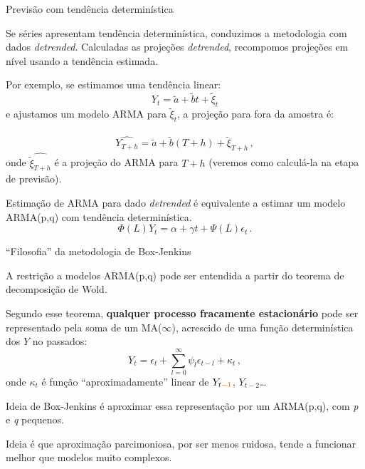 \documentclass[11pt]{beamer}
\newenvironment{halfwideitemize}{\itemize\addtolength{\itemsep}{0.5em}}{\enditemize}
\begin{document}
\begin{frame}{Previsão com tendência determinística}
	\begin{halfwideitemize}
				\item Se séries apresentam tendência determinística, conduzimos a metodologia com dados \textit{detrended}. Calculadas as projeções \textit{detrended}, recompomos projeções em nível usando a tendência estimada.
				
				\item Por exemplo, se estimamos uma tendência linear:
				$$Y_t = \tilde{a} + \tilde{b}t + \tilde{\xi}_t$$
				e ajustamos um modelo ARMA  para $\tilde{\xi}_t$, a projeção para fora da amostra é:
				
				$$\widehat{Y_{T+h}} = \tilde{a} + \tilde{b}(T+h) + \widehat{\tilde{\xi}_{T+h}}\, ,$$
				onde $\widehat{\tilde{\xi}_{T+h}}$ é a projeção do ARMA para $T+h$ (veremos como calculá-la na etapa de previsão).
	\item Estimação de ARMA para dado \textit{detrended} é equivalente a estimar um modelo ARMA(p,q) com tendência determinística.
$$\Phi(L) Y_t =  \alpha + \gamma t + \Psi(L)\epsilon_t \, .$$
	\end{halfwideitemize}
\end{frame}

\begin{frame}{``Filosofia'' da metodologia de Box-Jenkins}
	\begin{halfwideitemize}
		\item A restrição a modelos ARMA(p,q) pode ser entendida a partir do {\color{blue}teorema de decomposição de Wold.}
		\item Segundo esse teorema, \textbf{qualquer processo fracamente estacionário} pode ser representado pela soma de um MA($\infty$), acrescido de uma função determinística dos $Y$ no passados:
		$$Y_t = \epsilon_t  +\sum_{l=0}^\infty \psi_l \epsilon_{t-l} + \kappa_t \, ,$$
		onde $\kappa_t$ é função ``aproximadamente'' linear de $Y_{t{\color{red}-1}}$, $Y_{t-2}$\ldots 
			\item Ideia de Box-Jenkins é aproximar essa representação por um ARMA(p,q), com \textit{p} e \textit{q} {\color{blue}pequenos}.
		\begin{halfwideitemize}
			\item Ideia é que aproximação {\color{blue}parcimoniosa}, por ser menos ruidosa, tende a funcionar melhor que modelos muito complexos.
		\end{halfwideitemize}	
	\end{halfwideitemize}
\end{frame}
\end{document}
